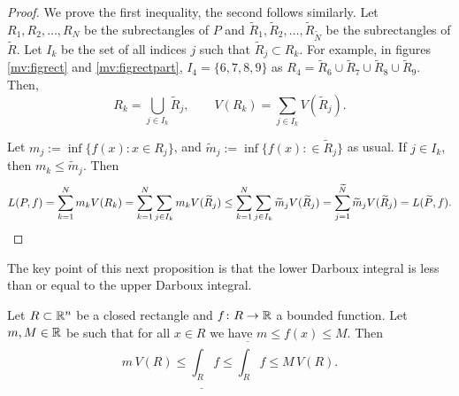 \begin{proof}
We prove the first inequality, the second follows similarly.
Let $R_1,R_2,\ldots,R_N$ be the subrectangles of $P$
and
$\widetilde{R}_1,\widetilde{R}_2,\ldots,\widetilde{R}_{\widetilde{N}}$ be the
subrectangles of
$\widetilde{R}$.
Let $I_k$ be the set of all indices $j$ such that $\widetilde{R}_j \subset R_k$.
For example, in figures \ref{mv:figrect} and
\ref{mv:figrectpart}, $I_4 = \{ 6, 7, 8, 9 \}$ as
$R_4 =
\widetilde{R}_6 \cup \widetilde{R}_7 \cup
\widetilde{R}_8 \cup \widetilde{R}_9$.
Then,
\begin{equation*}
R_k = \bigcup_{j \in I_k} \widetilde{R}_j,
\qquad
V(R_k) = \sum_{j \in I_k} V(\widetilde{R}_j).
\end{equation*}

Let $m_j := \inf \{ f(x) : x \in R_j \}$, and
$\widetilde{m}_j := \inf \{ f(x) : \in \widetilde{R}_j \}$ as usual.
If $j \in I_k$, then $m_k \leq \widetilde{m}_j$.  Then
\begin{equation*}
L(P,f) =
\sum_{k=1}^N m_k V(R_k)
=
\sum_{k=1}^N \sum_{j\in I_k} m_k V(\widetilde{R}_j)
\leq
\sum_{k=1}^N \sum_{j\in I_k} \widetilde{m}_j V(\widetilde{R}_j)
=
\sum_{j=1}^{\widetilde{N}} \widetilde{m}_j V(\widetilde{R}_j) = L(\widetilde{P},f) . \qedhere
\end{equation*}
\end{proof}

The key point of this next proposition is that
the lower Darboux integral is less than or equal to the upper Darboux
integral.

\begin{prop} \label{mv:intulbound:prop}
Let $R \subset {\mathbb{R}}^n$ be a closed rectangle and
$f \colon R \to {\mathbb{R}}$ a bounded function.  Let $m, M \in {\mathbb{R}}$ be 
such that for all $x \in R$ we have $m \leq f(x) \leq M$.  Then
\begin{equation}
\label{mv:intulbound:eq}
m \, V(R) \leq
\underline{\int_R} f \leq \overline{\int_R} f
\leq M \, V(R).
\end{equation}
\end{prop}

